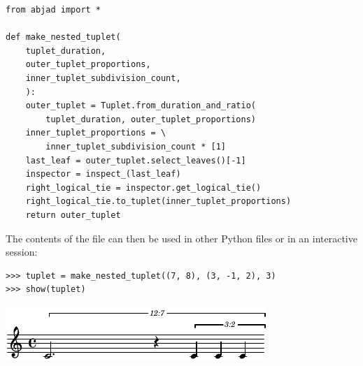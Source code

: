 \documentclass{article}
\begin{document}

\begin{lstlisting}
from abjad import *

def make_nested_tuplet(
    tuplet_duration,
    outer_tuplet_proportions,
    inner_tuplet_subdivision_count,
    ):
    outer_tuplet = Tuplet.from_duration_and_ratio(
        tuplet_duration, outer_tuplet_proportions)
    inner_tuplet_proportions = \
        inner_tuplet_subdivision_count * [1]
    last_leaf = outer_tuplet.select_leaves()[-1]
    inspector = inspect_(last_leaf)
    right_logical_tie = inspector.get_logical_tie()
    right_logical_tie.to_tuplet(inner_tuplet_proportions)
    return outer_tuplet
\end{lstlisting}

\noindent The contents of the file can then be used in other Python files or in an interactive session:

\begin{lstlisting}
>>> tuplet = make_nested_tuplet((7, 8), (3, -1, 2), 3)
>>> show(tuplet)
\end{lstlisting}
\includegraphics{assets/lilypond-4926e77647583925d3a89653f8577025.pdf}
\end{document}

